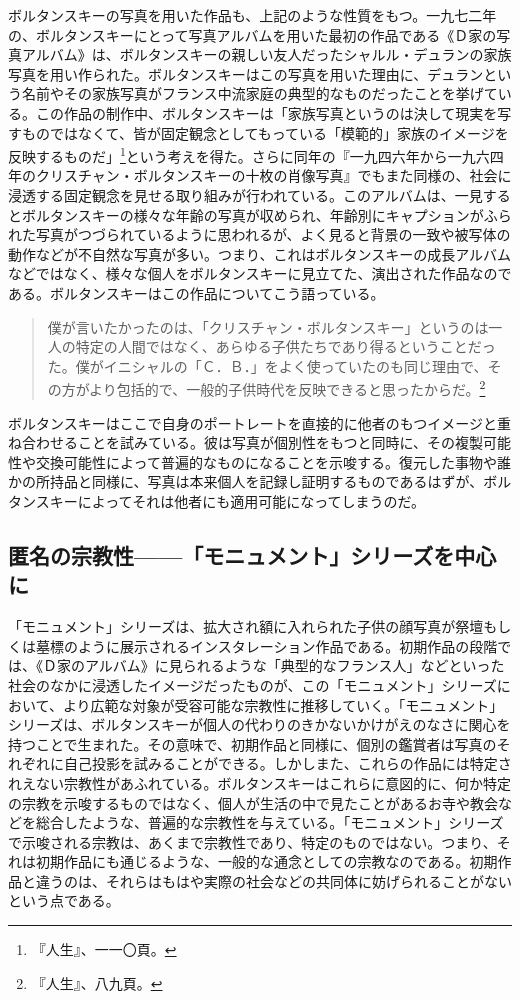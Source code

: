 \documentclass[b5j,twoside,twocolumn]{utarticle}
\newcommand{\mysubsection}[1]{\vspace{-6mm}\subsection{#1}\vspace{-2mm}}
\begin{document}
ボルタンスキーの写真を用いた作品も、上記のような性質をもつ。一九七二年の、ボルタンスキーにとって写真アルバムを用いた最初の作品である《Ｄ家の写真アルバム》は、ボルタンスキーの親しい友人だったシャルル・デュランの家族写真を用い作られた。ボルタンスキーはこの写真を用いた理由に、デュランという名前やその家族写真がフランス中流家庭の典型的なものだったことを挙げている。この作品の制作中、ボルタンスキーは「家族写真というのは決して現実を写すものではなくて、皆が固定観念としてもっている「模範的」家族のイメージを反映するものだ」\footnote{『人生』、一一〇頁。}という考えを得た。さらに同年の『一九四六年から一九六四年のクリスチャン・ボルタンスキーの十枚の肖像写真』でもまた同様の、社会に浸透する固定観念を見せる取り組みが行われている。このアルバムは、一見するとボルタンスキーの様々な年齢の写真が収められ、年齢別にキャプションがふられた写真がつづられているように思われるが、よく見ると背景の一致や被写体の動作などが不自然な写真が多い。つまり、これはボルタンスキーの成長アルバムなどではなく、様々な個人をボルタンスキーに見立てた、演出された作品なのである。ボルタンスキーはこの作品についてこう語っている。
\begin{quote}
僕が言いたかったのは、「クリスチャン・ボルタンスキー」というのは一人の特定の人間ではなく、あらゆる子供たちであり得るということだった。僕がイニシャルの「Ｃ．Ｂ．」をよく使っていたのも同じ理由で、その方がより包括的で、一般的子供時代を反映できると思ったからだ。\footnote{『人生』、八九頁。}
\end{quote}


ボルタンスキーはここで自身のポートレートを直接的に他者のもつイメージと重ね合わせることを試みている。彼は写真が個別性をもつと同時に、その複製可能性や交換可能性によって普遍的なものになることを示唆する。復元した事物や誰かの所持品と同様に、写真は本来個人を記録し証明するものであるはずが、ボルタンスキーによってそれは他者にも適用可能になってしまうのだ。
\mysubsection{\tbaselineshift =3.0pt 匿名の宗教性------「モニュメント」シリーズを中心に}
「モニュメント」シリーズは、拡大され額に入れられた子供の顔写真が祭壇もしくは墓標のように展示されるインスタレーション作品である。初期作品の段階では、《Ｄ家のアルバム》に見られるような「典型的なフランス人」などといった社会のなかに浸透したイメージだったものが、この「モニュメント」シリーズにおいて、より広範な対象が受容可能な宗教性に推移していく。「モニュメント」シリーズは、ボルタンスキーが個人の代わりのきかないかけがえのなさに関心を持つことで生まれた。その意味で、初期作品と同様に、個別の鑑賞者は写真のそれぞれに自己投影を試みることができる。しかしまた、これらの作品には特定されえない宗教性があふれている。ボルタンスキーはこれらに意図的に、何か特定の宗教を示唆するものではなく、個人が生活の中で見たことがあるお寺や教会などを総合したような、普遍的な宗教性を与えている。「モニュメント」シリーズで示唆される宗教は、あくまで宗教性であり、特定のものではない。つまり、それは初期作品にも通じるような、一般的な通念としての宗教なのである。初期作品と違うのは、それらはもはや実際の社会などの共同体に妨げられることがないという点である。
\end{document}
